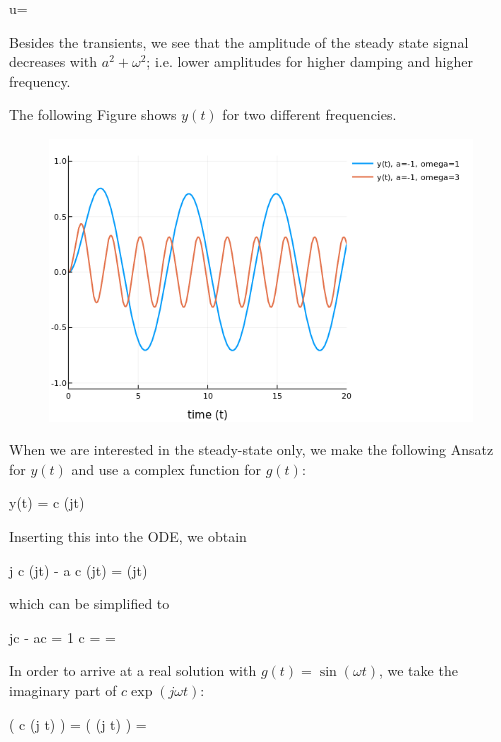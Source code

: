 \bee
u=
\eee

Besides the transients, we see that the amplitude of the steady state signal decreases with $a^2 + \omega^2$; i.e. lower amplitudes for higher damping and higher frequency.


The following Figure shows $y(t)$ for two different frequencies.

\begin{figure}[H]
	\includegraphics[scale=0.5]{images/ode_02_05.png}
\end{figure}


When we are interested in the steady-state only, we make the following Ansatz for $y(t)$ and use a complex function for $g(t)$:

\bee
y(t) = c \exp(j\omega t)
\eee

Inserting this into the ODE, we obtain

\bee
j c \omega \exp(j\omega t) - a c \exp(j\omega t) = \exp(j\omega t)
\eee

which can be simplified to

\bee
jc \omega - ac = 1 \rightarrow c =  = 
\eee

In order to arrive at a real solution with $g(t) = \sin(\omega t)$, we take the imaginary part of $c \exp(j \omega t)$:

\bee
\Im \left( c \exp(j \omega t) \right) = \Im \left(   \exp(j \omega t) \right) = 
\eee


